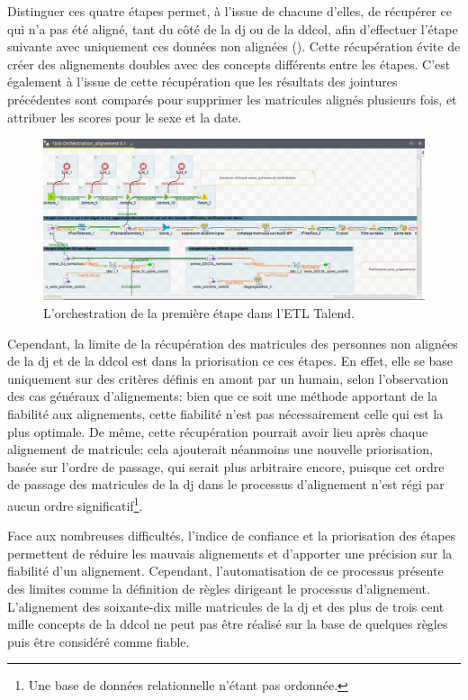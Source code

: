 Distinguer ces quatre étapes permet, à l'issue de chacune d'elles, de récupérer ce qui n'a pas été aligné, tant du côté de la \ac{dj} ou de la \ac{ddcol}, afin d'effectuer l'étape suivante avec uniquement ces données non alignées (). Cette récupération évite de créer des alignements doubles avec des concepts différents entre les étapes. C'est également à l'issue de cette récupération que les résultats des jointures précédentes sont comparés pour supprimer les matricules alignés plusieurs fois, et attribuer les scores pour le sexe et la date.\\
\begin{figure}[!h]
	\centering
	\includegraphics[width=16cm]{images/orchestration_partie1_dj.png}
	\caption{L'orchestration de la première étape dans l'ETL Talend.}
	\label{orchestration}
\end{figure}

Cependant, la limite de la récupération des matricules des personnes non alignées de la \ac{dj} et de la \ac{ddcol} est dans la priorisation ce ces étapes. En effet, elle se base uniquement sur des critères définis en amont par un humain, selon l'observation des cas généraux d'alignements: bien que ce soit une méthode apportant de la fiabilité aux alignements, cette fiabilité n'est pas nécessairement celle qui est la plus optimale. De même, cette récupération pourrait avoir lieu après chaque alignement de matricule: cela ajouterait néanmoins une nouvelle priorisation, basée sur l'ordre de passage, qui serait plus arbitraire encore, puisque cet ordre de passage des matricules de la \ac{dj} dans le processus d'alignement n'est régi par aucun ordre significatif\footnote{Une base de données relationnelle n'étant pas ordonnée.}.

\bigskip
\bigskip
Face aux nombreuses difficultés, l'indice de confiance et la priorisation des étapes permettent de réduire les mauvais alignements et d'apporter une précision sur la fiabilité d'un alignement. Cependant, l'automatisation de ce processus présente des limites comme la définition de règles dirigeant le processus d'alignement. L'alignement des soixante-dix mille matricules de la \ac{dj} et des plus de trois cent mille concepts de la \ac{ddcol} ne peut pas être réalisé sur la base de quelques règles puis être considéré comme fiable.